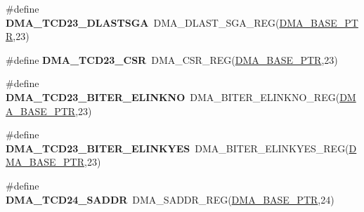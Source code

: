 \begin{DoxyCompactItemize}
\item 
\hypertarget{group___d_m_a___register___accessor___macros_gac073f8f96212331b4eaefb6ace5fe2ed}{}\#define {\bfseries D\+M\+A\+\_\+\+T\+C\+D23\+\_\+\+D\+L\+A\+S\+T\+S\+G\+A}~D\+M\+A\+\_\+\+D\+L\+A\+S\+T\+\_\+\+S\+G\+A\+\_\+\+R\+E\+G(\hyperlink{group___d_m_a___peripheral_ga6997fbc1b1973e9f27170217a3bd6f22}{D\+M\+A\+\_\+\+B\+A\+S\+E\+\_\+\+P\+T\+R},23)\label{group___d_m_a___register___accessor___macros_gac073f8f96212331b4eaefb6ace5fe2ed}

\item 
\hypertarget{group___d_m_a___register___accessor___macros_gabe84b078b7adfa7261a15cd5b359f195}{}\#define {\bfseries D\+M\+A\+\_\+\+T\+C\+D23\+\_\+\+C\+S\+R}~D\+M\+A\+\_\+\+C\+S\+R\+\_\+\+R\+E\+G(\hyperlink{group___d_m_a___peripheral_ga6997fbc1b1973e9f27170217a3bd6f22}{D\+M\+A\+\_\+\+B\+A\+S\+E\+\_\+\+P\+T\+R},23)\label{group___d_m_a___register___accessor___macros_gabe84b078b7adfa7261a15cd5b359f195}

\item 
\hypertarget{group___d_m_a___register___accessor___macros_gaf06c0c263d348278a8dfd70a573c85fd}{}\#define {\bfseries D\+M\+A\+\_\+\+T\+C\+D23\+\_\+\+B\+I\+T\+E\+R\+\_\+\+E\+L\+I\+N\+K\+N\+O}~D\+M\+A\+\_\+\+B\+I\+T\+E\+R\+\_\+\+E\+L\+I\+N\+K\+N\+O\+\_\+\+R\+E\+G(\hyperlink{group___d_m_a___peripheral_ga6997fbc1b1973e9f27170217a3bd6f22}{D\+M\+A\+\_\+\+B\+A\+S\+E\+\_\+\+P\+T\+R},23)\label{group___d_m_a___register___accessor___macros_gaf06c0c263d348278a8dfd70a573c85fd}

\item 
\hypertarget{group___d_m_a___register___accessor___macros_ga2eef2c99f566f80f5eec28a2fca29ab3}{}\#define {\bfseries D\+M\+A\+\_\+\+T\+C\+D23\+\_\+\+B\+I\+T\+E\+R\+\_\+\+E\+L\+I\+N\+K\+Y\+E\+S}~D\+M\+A\+\_\+\+B\+I\+T\+E\+R\+\_\+\+E\+L\+I\+N\+K\+Y\+E\+S\+\_\+\+R\+E\+G(\hyperlink{group___d_m_a___peripheral_ga6997fbc1b1973e9f27170217a3bd6f22}{D\+M\+A\+\_\+\+B\+A\+S\+E\+\_\+\+P\+T\+R},23)\label{group___d_m_a___register___accessor___macros_ga2eef2c99f566f80f5eec28a2fca29ab3}

\item 
\hypertarget{group___d_m_a___register___accessor___macros_ga4a9023f33923a9c128f5ed4bd3e87b17}{}\#define {\bfseries D\+M\+A\+\_\+\+T\+C\+D24\+\_\+\+S\+A\+D\+D\+R}~D\+M\+A\+\_\+\+S\+A\+D\+D\+R\+\_\+\+R\+E\+G(\hyperlink{group___d_m_a___peripheral_ga6997fbc1b1973e9f27170217a3bd6f22}{D\+M\+A\+\_\+\+B\+A\+S\+E\+\_\+\+P\+T\+R},24)\label{group___d_m_a___register___accessor___macros_ga4a9023f33923a9c128f5ed4bd3e87b17}


\end{DoxyCompactItemize}
